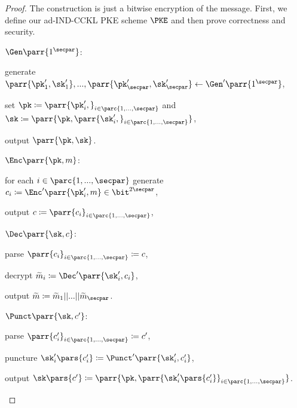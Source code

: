 \begin{proof}
    The construction is just a bitwise encryption of the message.
    First, we define our ad-IND-CCKL PKE scheme \(\PKE\) and then prove correctness and security.
    \begin{sitemize}
        \item \(\Gen\parr{1^\secpar}\):
        \begin{sitemize}
            \item generate \(\parr{\pk'_1,\sk'_1}, ..., \parr{\pk'_\secpar,\sk'_\secpar} \gets \Gen'\parr{1^{\secpar}}\),
            \item set \(\pk \coloneqq \parr{\pk'_i,}_{i \in \parc{1,...,\secpar}}\) and \(\sk \coloneqq \parr{\pk,\parr{\sk'_i,}_{i \in \parc{1,...,\secpar}}}\),
            \item output \(\parr{\pk,\sk}\).
        \end{sitemize}

        \item \(\Enc\parr{\pk,m}\):
        \begin{sitemize}
            \item for each \(i \in \parc{1,...,\secpar}\) generate \(c_i \coloneqq \Enc'\parr{\pk'_i,m} \in \bit^{2\secpar}\),
            \item output \(c \coloneqq \parr{c_i}_{i \in \parc{1,...,\secpar}}\),
        \end{sitemize}

        \item \(\Dec\parr{\sk,c}\):
        \begin{sitemize}
            \item parse \(\parr{c_i}_{i \in \parc{1,...,\secpar}} \coloneqq c\),
            \item decrypt \(\widetilde{m}_i \coloneqq \Dec'\parr{\sk'_i,c_i}\),
            \item output \(\widetilde{m} \coloneqq \widetilde{m}_1||...||\widetilde{m}_\secpar\).
        \end{sitemize}

        \item \(\Punct\parr{\sk, c'}\):
        \begin{sitemize}
            \item parse \(\parr{c'_i}_{i \in \parc{1,...,\secpar}} \coloneqq c'\),
            \item puncture \(\sk'_i\pars{c'_i} \coloneqq \Punct'\parr{\sk'_i,c'_i}\),
            \item output \(\sk\pars{c'} \coloneqq \parr{\pk,\parr{\sk'_i\pars{c'_i}}_{i \in \parc{1,...,\secpar}}}\).
        \end{sitemize}


\end{sitemize}
\end{proof}
